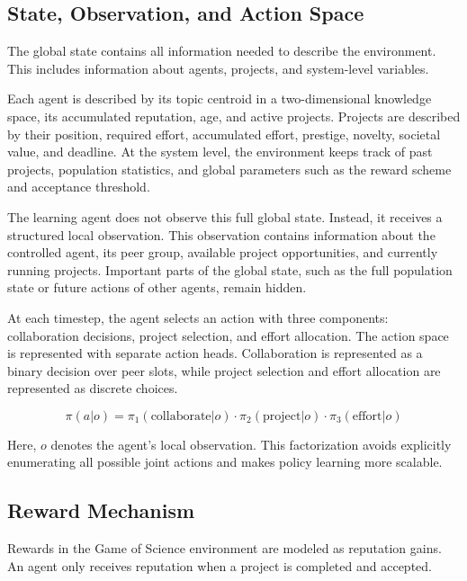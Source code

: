 \documentclass[english,bachelor]{hsluthesis}
\begin{document}
\subsection{State, Observation, and Action Space}

The global state contains all information needed to describe the environment. This includes information about agents, projects, and system-level variables.

Each agent is described by its topic centroid in a two-dimensional knowledge space, its accumulated reputation, age, and active projects. Projects are described by their position, required effort, accumulated effort, prestige, novelty, societal value, and deadline. At the system level, the environment keeps track of past projects, population statistics, and global parameters such as the reward scheme and acceptance threshold.

The learning agent does not observe this full global state. Instead, it receives a structured local observation. This observation contains information about the controlled agent, its peer group, available project opportunities, and currently running projects. Important parts of the global state, such as the full population state or future actions of other agents, remain hidden.

At each timestep, the agent selects an action with three components: collaboration decisions, project selection, and effort allocation. The action space is represented with separate action heads. Collaboration is represented as a binary decision over peer slots, while project selection and effort allocation are represented as discrete choices.

\begin{equation}
\pi(a|o)=\pi_1(\text{collaborate}|o)\cdot\pi_2(\text{project}|o)\cdot\pi_3(\text{effort}|o)
\end{equation}

Here, $o$ denotes the agent's local observation. This factorization avoids explicitly enumerating all possible joint actions and makes policy learning more scalable.

\subsection{Reward Mechanism}

Rewards in the Game of Science environment are modeled as reputation gains. An agent only receives reputation when a project is completed and accepted.
\end{document}

